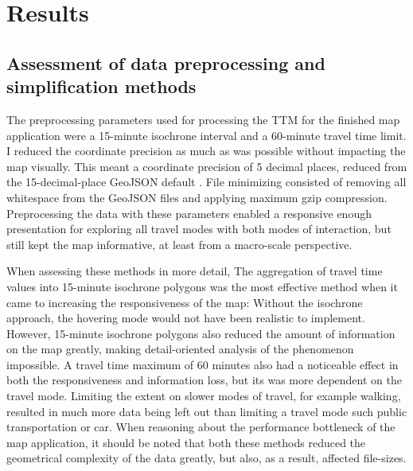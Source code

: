 \section{Results}

\subsection{Assessment of data preprocessing and simplification methods}

The preprocessing parameters used for
processing the TTM for the finished map application were
a 15-minute isochrone interval and a 60-minute travel time limit.
I reduced the coordinate precision as much as
was possible without impacting the map visually.
This meant a coordinate precision of 5 decimal places,
reduced from the 15-decimal-place GeoJSON default \parencite{geojsonspec}.
File minimizing consisted of removing all whitespace from the GeoJSON files
and applying maximum gzip compression.
Preprocessing the data with these parameters
enabled a responsive enough presentation for exploring all travel modes
with both modes of interaction,
but still kept the map informative, at least from a macro-scale perspective.

When assessing these methods in more detail,
The aggregation of travel time values into 15-minute isochrone polygons was the most 
effective method when it came to increasing the responsiveness of the map:
Without the isochrone approach,
the hovering mode would not have been realistic to implement.
However, 15-minute isochrone polygons also reduced the amount of information on the map greatly,
making detail-oriented analysis of the phenomenon impossible.
A travel time maximum of 60 minutes also had a noticeable effect
in both the responsiveness and information loss,
but its was more dependent on the travel mode.
Limiting the extent on slower modes of travel, for example walking,
resulted in much more data being left out than limiting a travel mode such public transportation or car.
When reasoning about the performance bottleneck of the map application,
it should be noted that both these methods reduced the geometrical complexity of the data greatly,
but also, as a result, affected file-sizes.




